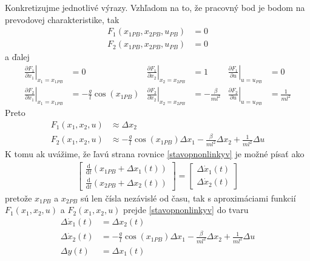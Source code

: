 \documentclass[a4paper, 10pt, ]{article}
\begin{document}
Konkretizujme jednotlivé výrazy. Vzhľadom na to, že pracovný bod je bodom na prevodovej charakteristike, tak
\begin{align}
    F_1(x_{1PB}, x_{2PB}, u_{PB}) &= 0 \\
    F_2(x_{1PB}, x_{2PB}, u_{PB}) &= 0 
\end{align}
a ďalej
\begin{align}
    \left. \frac{\partial F_1}{\partial x_1} \right|_{x_1=x_{1PB}} &= 0 &
    \left. \frac{\partial F_1}{\partial x_2} \right|_{x_2=x_{2PB}} &= 1 &
    \left. \frac{\partial F_1}{\partial u} \right|_{u=u_{PB}} &= 0 \\
    \left. \frac{\partial F_2}{\partial x_1} \right|_{x_1=x_{1PB}} &= - \frac{g}{l} \cos\left(x_{1PB}\right) &
    \left. \frac{\partial F_2}{\partial x_2} \right|_{x_2=x_{2PB}} &= - \frac{\beta}{ml^2} &
    \left. \frac{\partial F_2}{\partial u} \right|_{u=u_{PB}} &=  \frac{1}{ml^2}
\end{align}
Preto
\begin{align}
    F_1(x_1, x_2, u) &\approx \Delta x_2 \\
    F_2(x_1, x_2, u) &\approx  - \frac{g}{l} \cos\left(x_{1PB}\right) \Delta x_1   - \frac{\beta}{ml^2} \Delta x_2 + \frac{1}{ml^2} \Delta u
\end{align}
K tomu ak uvážime, že ľavú strana rovnice \eqref{stavopnonlinkyv} je možné písať ako
	\begin{align}
		\begin{bmatrix}
			\frac{\text{d}}{\text{d}t} \left( x_{1PB} + \Delta x_1(t) \right)   \\
            \frac{\text{d}}{\text{d}t} \left( x_{2PB} + \Delta x_2(t) \right)
		\end{bmatrix}
        =
        \begin{bmatrix}
			 \Delta \dot x_1(t)    \\
             \Delta \dot x_2(t)
		\end{bmatrix}
	\end{align}
pretože $x_{1PB}$ a $x_{2PB}$ sú len čísla nezávislé od času, tak s aproximáciami funkcií $F_1(x_1, x_2, u)$ a $F_2(x_1, x_2, u)$ prejde \eqref{stavopnonlinkyv} do tvaru
\begin{subequations} %
	\begin{align}
        \Delta \dot x_1(t) &=  \Delta x_2(t) \\
        \Delta \dot x_2(t) &=
        - \frac{g}{l} \cos\left(x_{1PB}\right) \Delta x_1   - \frac{\beta}{ml^2} \Delta x_2 + \frac{1}{ml^2} \Delta u \\
        \Delta y(t) &= \Delta x_1(t)
	\end{align}
\end{subequations}
\end{document}
